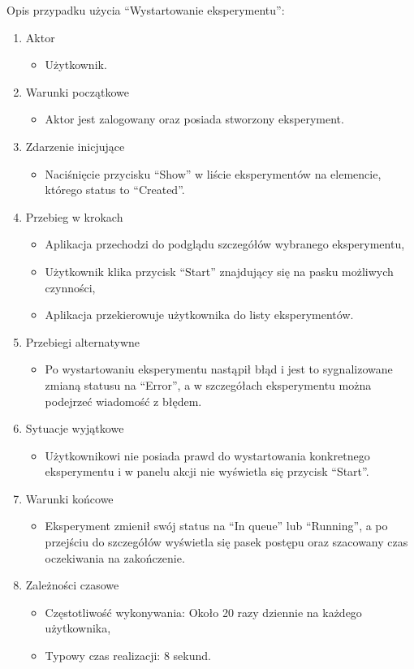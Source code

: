 Opis przypadku użycia \enquote{Wystartowanie eksperymentu}:
\begin{enumerate}
	\item  Aktor
	\begin{itemize}
		\item Użytkownik. 
	\end{itemize}
	\item Warunki początkowe
	\begin{itemize}
		\item Aktor jest zalogowany oraz posiada stworzony eksperyment.
	\end{itemize}
	\item Zdarzenie inicjujące
	\begin{itemize}
		\item Naciśnięcie przycisku \enquote{Show} w liście eksperymentów na elemencie, którego status to \enquote{Created}.
	\end{itemize}
	\item Przebieg w krokach
	\begin{itemize}
		\item Aplikacja przechodzi do podglądu szczegółów wybranego eksperymentu,
		\item Użytkownik klika przycisk \enquote{Start} znajdujący się na pasku możliwych czynności,
		\item Aplikacja przekierowuje użytkownika do listy eksperymentów.
	\end{itemize}
	\item Przebiegi alternatywne
	\begin{itemize}
		\item  Po wystartowaniu eksperymentu nastąpił błąd i jest to sygnalizowane zmianą statusu na \enquote{Error}, a w szczegółach eksperymentu można podejrzeć wiadomość z błędem.
	\end{itemize}
	\item Sytuacje wyjątkowe
	\begin{itemize}
		\item  Użytkownikowi nie posiada prawd do wystartowania konkretnego eksperymentu i w panelu akcji nie wyświetla się przycisk \enquote{Start}.
	\end{itemize}
	\item Warunki końcowe
	\begin{itemize}
		\item  Eksperyment zmienił swój status na \enquote{In queue} lub \enquote{Running}, a po przejściu do szczegółów wyświetla się pasek postępu oraz szacowany czas oczekiwania na zakończenie.
	\end{itemize}
	\item Zależności czasowe
	\begin{itemize}
		\item Częstotliwość wykonywania: Około 20 razy dziennie na każdego użytkownika,
		\item Typowy czas realizacji: 8 sekund.
	\end{itemize}
\end{enumerate}

